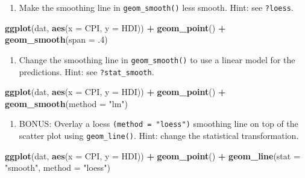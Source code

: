\documentclass[]{book}
\newenvironment{Shaded}{\begin{snugshade}}{\end{snugshade}}
\newcommand{\KeywordTok}[1]{\textcolor[rgb]{0.13,0.29,0.53}{\textbf{#1}}}
\newcommand{\DataTypeTok}[1]{\textcolor[rgb]{0.13,0.29,0.53}{#1}}
\newcommand{\DecValTok}[1]{\textcolor[rgb]{0.00,0.00,0.81}{#1}}
\newcommand{\StringTok}[1]{\textcolor[rgb]{0.31,0.60,0.02}{#1}}
\newcommand{\OperatorTok}[1]{\textcolor[rgb]{0.81,0.36,0.00}{\textbf{#1}}}
\newcommand{\NormalTok}[1]{#1}
\providecommand{\tightlist}{%
  \setlength{\itemsep}{0pt}\setlength{\parskip}{0pt}}
\begin{document}
\begin{enumerate}
\def\labelenumi{\arabic{enumi}.}
\setcounter{enumi}{2}
\tightlist
\item
  Make the smoothing line in \texttt{geom\_smooth()} less smooth. Hint:
  see \texttt{?loess}.
\end{enumerate}

\begin{Shaded}
\begin{Highlighting}[]
\KeywordTok{ggplot}\NormalTok{(dat, }\KeywordTok{aes}\NormalTok{(}\DataTypeTok{x =}\NormalTok{ CPI, }\DataTypeTok{y =}\NormalTok{ HDI)) }\OperatorTok{+}
\StringTok{  }\KeywordTok{geom_point}\NormalTok{() }\OperatorTok{+}
\StringTok{  }\KeywordTok{geom_smooth}\NormalTok{(}\DataTypeTok{span =}\NormalTok{ .}\DecValTok{4}\NormalTok{)}
\end{Highlighting}
\end{Shaded}

\begin{enumerate}
\def\labelenumi{\arabic{enumi}.}
\setcounter{enumi}{3}
\tightlist
\item
  Change the smoothing line in \texttt{geom\_smooth()} to use a linear
  model for the predictions. Hint: see \texttt{?stat\_smooth}.
\end{enumerate}

\begin{Shaded}
\begin{Highlighting}[]
\KeywordTok{ggplot}\NormalTok{(dat, }\KeywordTok{aes}\NormalTok{(}\DataTypeTok{x =}\NormalTok{ CPI, }\DataTypeTok{y =}\NormalTok{ HDI)) }\OperatorTok{+}
\StringTok{  }\KeywordTok{geom_point}\NormalTok{() }\OperatorTok{+}
\StringTok{  }\KeywordTok{geom_smooth}\NormalTok{(}\DataTypeTok{method =} \StringTok{"lm"}\NormalTok{)}
\end{Highlighting}
\end{Shaded}

\begin{enumerate}
\def\labelenumi{\arabic{enumi}.}
\setcounter{enumi}{4}
\tightlist
\item
  BONUS: Overlay a loess \texttt{(method\ =\ "loess")} smoothing line on
  top of the scatter plot using \texttt{geom\_line()}. Hint: change the
  statistical transformation.
\end{enumerate}

\begin{Shaded}
\begin{Highlighting}[]
\KeywordTok{ggplot}\NormalTok{(dat, }\KeywordTok{aes}\NormalTok{(}\DataTypeTok{x =}\NormalTok{ CPI, }\DataTypeTok{y =}\NormalTok{ HDI)) }\OperatorTok{+}
\StringTok{  }\KeywordTok{geom_point}\NormalTok{() }\OperatorTok{+}
\StringTok{  }\KeywordTok{geom_line}\NormalTok{(}\DataTypeTok{stat =} \StringTok{"smooth"}\NormalTok{, }\DataTypeTok{method =} \StringTok{"loess"}\NormalTok{)}
\end{Highlighting}
\end{Shaded}
\end{document}

